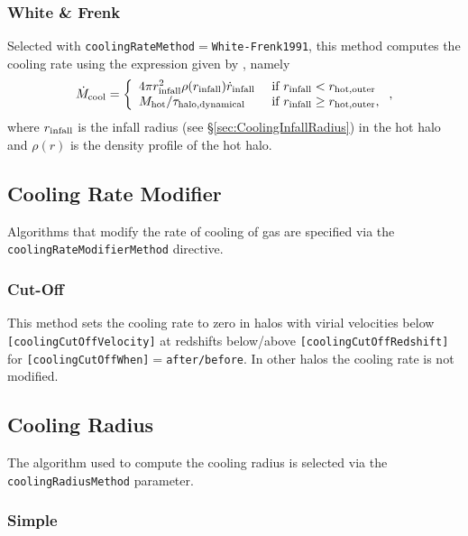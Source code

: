 \subsubsection{White \& Frenk}

Selected with {\tt coolingRateMethod}$=${\tt White-Frenk1991}, this method computes the cooling rate using the expression given by \cite{white_galaxy_1991}, namely
\begin{equation}
\dot{M}_{\rm cool} = \left\{ \begin{array}{ll} 4 \pi r_{\rm infall}^2 \rho(r_{\rm infall}) \dot{r}_{\rm infall}& \hbox{ if } r_{\rm infall} < r_{\rm hot, outer} \\ M_{\rm hot}/\tau_{\rm halo, dynamical} & \hbox{ if } r_{\rm infall} \ge r_{\rm hot, outer}, \end{array} \right. ,
\end{equation}
where $r_{\rm infall}$ is the infall radius (see \S\ref{sec:CoolingInfallRadius}) in the hot halo and $\rho(r)$ is the density profile of the hot halo.

\subsection{Cooling Rate Modifier}\label{sec:CoolingRateModifier}

Algorithms that modify the rate of cooling of gas are specified via the {\tt coolingRateModifierMethod} directive.

\subsubsection{Cut-Off}

This method sets the cooling rate to zero in halos with virial velocities below {\tt [coolingCutOffVelocity]} at redshifts below/above {\tt [coolingCutOffRedshift]} for {\tt [coolingCutOffWhen]}$=${\tt after/before}. In other halos the cooling rate is not modified.

\subsection{Cooling Radius}\label{sec:CoolingRadius}

The algorithm used to compute the cooling radius is selected via the {\tt coolingRadiusMethod} parameter.

\subsubsection{Simple}

